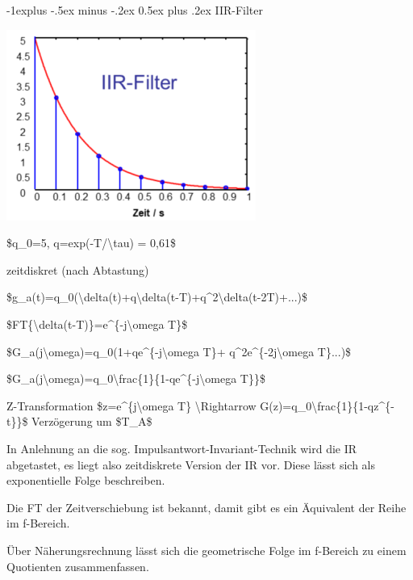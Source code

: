 \documentclass[a4paper]{article}
\makeatletter
\renewcommand{\subsection}{\@startsection{subsection}{2}{0mm}%
 {-1explus -.5ex minus -.2ex}%
 {0.5ex plus .2ex}%
 {\normalfont\normalsize\bfseries}}
\makeatother
\begin{document}
\begin{multicols}{3}
  \subsection{IIR-Filter}\label{iir-filter}

  \begin{itemize*}
    \item \includegraphics[width=.5\linewidth]{Assets/Biosignalverarbeitung-iir-3.png}
    \begin{itemize*}
      \item \$q\_0=5, q=exp(-T/\textbackslash tau) = 0,61\$
    \end{itemize*}
    \item zeitdiskret (nach Abtastung)
    \begin{itemize*}
      \item \$g\_a(t)=q\_0(\textbackslash delta(t)+q\textbackslash delta(t-T)+q\^{}2\textbackslash delta(t-2T)+...)\$
      \item \$FT\{\textbackslash delta(t-T)\}=e\^{}\{-j\textbackslash omega T\}\$
      \item \$G\_a(j\textbackslash omega)=q\_0(1+qe\^{}\{-j\textbackslash omega T\}+ q\^{}2e\^{}\{-2j\textbackslash omega T\}...)\$
      \item \$G\_a(j\textbackslash omega)=q\_0\textbackslash frac\{1\}\{1-qe\^{}\{-j\textbackslash omega T\}\}\$
      \item Z-Transformation \$z=e\^{}\{j\textbackslash omega T\} \textbackslash Rightarrow G(z)=q\_0\textbackslash frac\{1\}\{1-qz\^{}\{-t\}\}\$ Verzögerung um \$T\_A\$
    \end{itemize*}
    \item In Anlehnung an die sog. Impulsantwort-Invariant-Technik wird die IR abgetastet, es liegt also zeitdiskrete Version der IR vor. Diese lässt sich als exponentielle Folge beschreiben.
    \item Die FT der Zeitverschiebung ist bekannt, damit gibt es ein Äquivalent der Reihe im f-Bereich.
    \item Über Näherungsrechnung lässt sich die geometrische Folge im f-Bereich zu einem Quotienten zusammenfassen.

\end{itemize*}
\end{multicols}
\end{document}
